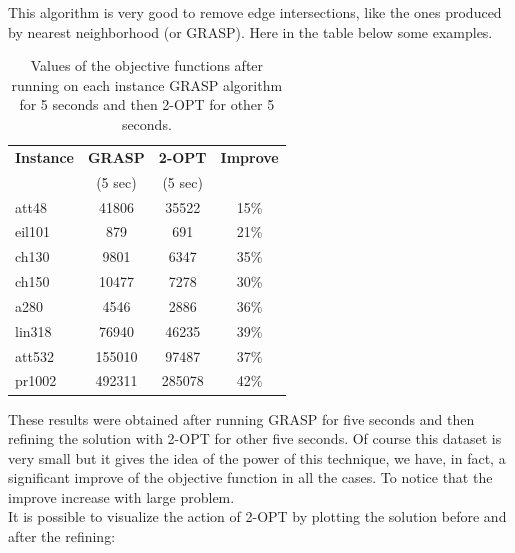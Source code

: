 \noindent This algorithm is very good to remove edge intersections, like the ones produced  by nearest neighborhood (or GRASP). Here in the table below some examples.\\

\begin{table}[h!]
	\begin{center}
		\begin{tabular}{l|c|c|c}
			\textbf{Instance} & \textbf{GRASP} & \textbf{2-OPT} & \textbf{Improve}	\\
			& (5 sec) & (5 sec) & \\
			\hline
			att48 & 41806 & 35522 & 15\% \\
			eil101 & 879 & 691 & 21\% \\
			ch130 & 9801 & 6347 & 35\% \\
			ch150 & 10477 & 7278 & 30\% \\
			a280 & 4546 & 2886 & 36\% \\
			lin318 & 76940 & 46235 & 39\% \\ 
			att532 & 155010 & 97487 & 37\% \\	
			pr1002 & 492311 & 285078 & 42\% \\
		\end{tabular}
		\caption{Values of the objective functions after running on each instance GRASP algorithm for 5 seconds and then 2-OPT for other 5 seconds.}
	\end{center}
\end{table}

\noindent These results were obtained after running GRASP for five seconds and then refining the solution with 2-OPT for other five seconds. Of course this dataset is very small but it gives the idea of the power of this technique, we have, in fact, a significant improve of the objective function in all the cases. To notice that the improve increase with large problem. \\
It is possible to visualize the action of 2-OPT by plotting the solution before and after the refining:

